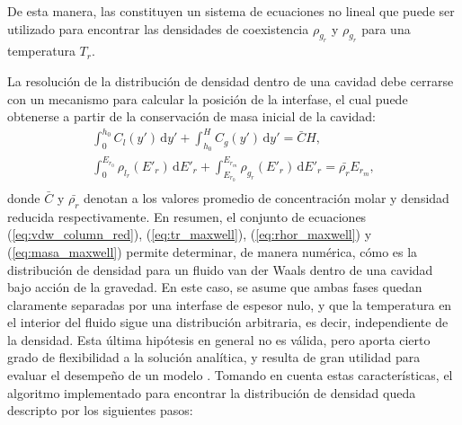 De esta manera, las  constituyen un sistema de ecuaciones no lineal que puede ser utilizado para encontrar las densidades de coexistencia $\rho_{g_r}$ y $\rho_{g_r}$ para una temperatura $T_r$.

La resoluci\'on de la distribuci\'on de densidad dentro de una cavidad debe cerrarse con un mecanismo para calcular la posici\'on de la interfase, el cual puede obtenerse a partir de la conservaci\'on de masa inicial de la cavidad:
\begin{equation}
	\begin{gathered}
		\int_{0}^{h_0} C_l(y') \, \mbox{d}y' + \int_{h_0}^{H} C_g(y') \, \mbox{d}y' = \bar{C}H ,\\[3mm]
		\int_{0}^{E_{r_0}} \rho_{l_r} (E'_r) \, \mbox{d}E'_r + \int_{E_{r_0}}^{E_{r_m}} \rho_{g_r}(E'_r) \, \mbox{d}E'_r = \bar{\rho_r}E_{r_m}, \\
	\end{gathered}
	\label{eq:masa_maxwell}
\end{equation}
donde $\bar{C}$ y $\bar{\rho_r}$ denotan a los valores promedio de concentraci\'on molar y densidad reducida respectivamente. En resumen, el conjunto de ecuaciones (\ref{eq:vdw_column_red}), (\ref{eq:tr_maxwell}), (\ref{eq:rhor_maxwell}) y (\ref{eq:masa_maxwell}) permite determinar, de manera num\'erica, c\'omo es la distribuci\'on de densidad para un fluido van der Waals dentro de una cavidad  bajo acci\'on de la gravedad. En este caso, se asume que ambas fases quedan claramente separadas por una interfase de espesor nulo, y que la temperatura en el interior del fluido sigue una distribuci\'on arbitraria, es decir, independiente de la densidad.  Esta \'ultima hip\'otesis en general no es v\'alida, pero aporta cierto grado de flexibilidad a la soluci\'on anal\'itica, y resulta de gran utilidad para evaluar el desempe\~no de un modelo \pp{}. Tomando en cuenta estas caracter\'isticas, el algoritmo implementado para encontrar la distribuci\'on de densidad queda descripto por los siguientes pasos:

